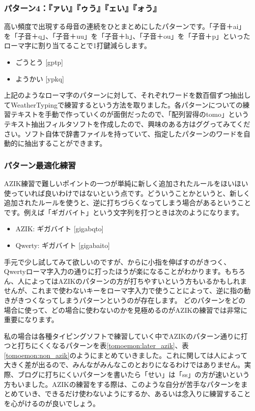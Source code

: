 \subsubsection*{パターン4：『ァい』『ゥう』『ェい』『ォう』}
高い頻度で出現する母音の連続をひとまとめにしたパターンです。「子音＋ai」を「子音＋q」、「子音＋uu」を「子音＋h」、「子音＋ou」を「子音＋p」といったローマ字に割り当てることで1打鍵減らします。
\begin{itemize}
 \item ごうとう [gptp]
 \item ようかい [ypkq]
\end{itemize}

上記のようなローマ字のパターンに対して、それぞれワードを数百個ずつ抽出してWeatherTypingで練習するという方法を取りました。各パターンについての練習テキストを手動で作っていくのが面倒だったので、「配列習得のtomo」というテキスト抽出フィルタソフトを作成したので、興味のある方はググってみてください。ソフト自体で辞書ファイルを持っていて、指定したパターンのワードを自動的に抽出することができます。

\subsubsection*{パターン最適化練習}
AZIK練習で難しいポイントの一つが単純に新しく追加されたルールをほいほい使っていれば良いわけではないという点です。どういうことかというと、新しく追加されたルールを使うと、逆に打ちづらくなってしまう場合があるということです。例えば「ギガバイト」という文字列を打つときは次のようになります。

\begin{itemize}
 \item AZIK: ギガバイト [gigabqto]
 \item Qwerty: ギガバイト [gigabaito]
\end{itemize}

手元で少し試してみて欲しいのですが、からに小指を伸ばすのがきつく、Qwertyローマ字入力の通りに打ったほうが楽になることがわかります。もちろん、人によってはAZIKのパターンの方が打ちやすいという方もいるかもしれませんが、これまで使わないキーをローマ字入力で使うことによって、逆に指の動きがきつくなってしまうパターンというのが存在します。
どのパターンをどの場合に使って、どの場合に使わないのかを見極めるのがAZIKの練習では非常に重要になります。

私の場合は各種タイピングソフトで練習していく中でAZIKのパターン通りに打つと打ちにくくなるパターンを表\ref{tomoemon:later_azik}、表\ref{tomoemon:non_azik}のようにまとめていきました。これに関しては人によって大きく差が出るので、みんながみんなこのとおりになるわけではありません。実際、ブログに打ちにくいパターンを書いたら「せい」は「ss」の方が速いという方もいました。AZIKの練習をする際は、このような自分が苦手なパターンをまとめていき、できるだけ使わないようにするか、あるいは念入りに練習することを心がけるのが良いでしょう。

